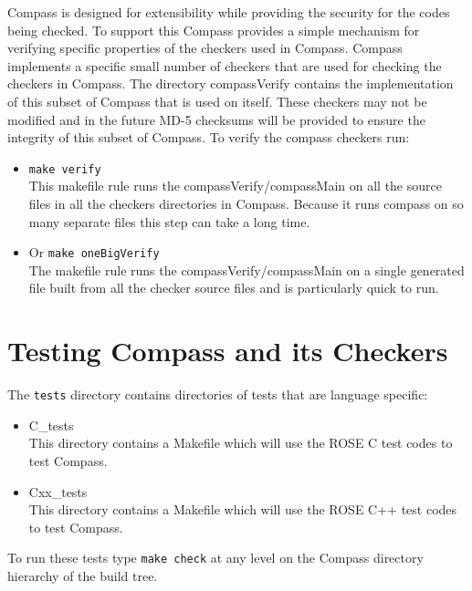     Compass is designed for extensibility while providing the security for
the codes being checked.  To support this Compass provides a simple
mechanism for verifying specific properties of the checkers used in Compass.
Compass implements a specific small number of checkers that are used for checking
the checkers in Compass.  The directory compassVerify contains the implementation
of this subset of Compass that is used on itself.  These checkers may not
be modified and in the future MD-5 checksums will be provided to ensure the
integrity of this subset of Compass.  To verify the compass checkers run:
\begin{itemize}
   \item {\tt make verify} \\
        This makefile rule runs the compassVerify/compassMain on all the source files in
    all the checkers directories in Compass.  Because it runs compass on so
    many separate
    files this step can take a long time.
   \item Or {\tt make oneBigVerify} \\
        The makefile rule runs the compassVerify/compassMain on a single generated file
    built from all the checker source files and is particularly quick to run.
\end{itemize}



\section{Testing Compass and its Checkers}

   The {\tt tests} directory contains directories of tests that
are language specific:
\begin{itemize}
   \item C\_tests \\ 
         This directory contains a Makefile which will use the ROSE C test codes 
         to test Compass.
   \item Cxx\_tests \\ 
         This directory contains a Makefile which will use the ROSE C++ test codes 
         to test Compass.
\end{itemize}
To run these tests type {\tt make check} at any level on the Compass directory
hierarchy of the build tree.




